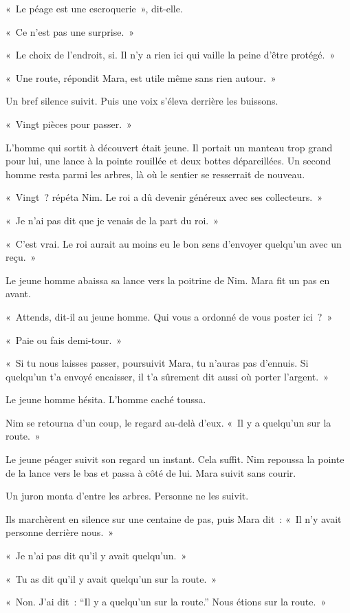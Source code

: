 \documentclass[10pt,a4paper]{article}
\begin{document}
«~Le péage est une escroquerie~», dit-elle.

«~Ce n’est pas une surprise.~»

«~Le choix de l’endroit, si. Il n’y a rien ici qui vaille la peine d’être protégé.~»

«~Une route, répondit Mara, est utile même sans rien autour.~»

Un bref silence suivit. Puis une voix s’éleva derrière les buissons.

«~Vingt pièces pour passer.~»

L’homme qui sortit à découvert était jeune. Il portait un manteau trop grand pour lui, une lance à la pointe rouillée et deux bottes dépareillées. Un second homme resta parmi les arbres, là où le sentier se resserrait de nouveau.

«~Vingt~? répéta Nim. Le roi a dû devenir généreux avec ses collecteurs.~»

«~Je n’ai pas dit que je venais de la part du roi.~»

«~C’est vrai. Le roi aurait au moins eu le bon sens d’envoyer quelqu’un avec un reçu.~»

Le jeune homme abaissa sa lance vers la poitrine de Nim. Mara fit un pas en avant.

«~Attends, dit-il au jeune homme. Qui vous a ordonné de vous poster ici~?~»

«~Paie ou fais demi-tour.~»

«~Si tu nous laisses passer, poursuivit Mara, tu n’auras pas d’ennuis. Si quelqu’un t’a envoyé encaisser, il t’a sûrement dit aussi où porter l’argent.~»

Le jeune homme hésita. L’homme caché toussa.

Nim se retourna d’un coup, le regard au-delà d’eux. «~Il y a quelqu’un sur la route.~»

Le jeune péager suivit son regard un instant. Cela suffit. Nim repoussa la pointe de la lance vers le bas et passa à côté de lui. Mara suivit sans courir.

Un juron monta d’entre les arbres. Personne ne les suivit.

Ils marchèrent en silence sur une centaine de pas, puis Mara dit~: «~Il n’y avait personne derrière nous.~»

«~Je n’ai pas dit qu’il y avait quelqu’un.~»

«~Tu as dit qu’il y avait quelqu’un sur la route.~»

«~Non. J’ai dit~: “Il y a quelqu’un sur la route.” Nous étions sur la route.~»
\end{document}
